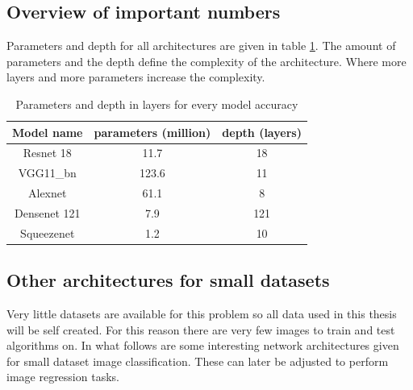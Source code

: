 	\subsection{Overview of important numbers}
	\label{sec:lit:va:overview}
Parameters and depth for all architectures are given in table \ref{tab:lit:ov:paramdepth}. The amount of parameters and the depth define the complexity of the architecture. Where more layers and more parameters increase the complexity.
	\begin{table}[!ht]
	\centering
	\caption{Parameters and depth in layers for every model accuracy}
\begin{tabular}{c | c c}
			Model name		& parameters (million) 		& depth (layers) \\ \hline
			Resnet 18			&	11.7 			&	18 				\\
			VGG11\_bn			&	123.6 			& 11					\\
			Alexnet				&	61.1 			& 8					\\
			Densenet 121	&	7.9 			& 121				\\
			Squeezenet		&	1.2 			& 10
\end{tabular}
\centering

\label{tab:lit:ov:paramdepth}
\end{table}


\subsection{Other architectures for small datasets}
\label{sec:lit:va:un:other}





	Very little datasets are available for this problem so all data used in this thesis will be self created. For this reason there are very few images to train and test algorithms on. In what follows are some interesting network architectures given for small dataset image classification. These can later be adjusted to perform image regression tasks.
	
